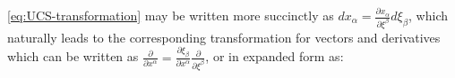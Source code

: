 \ref{eq:UCS-transformation} may be written more succinctly as 
$d{x_\alpha } = \frac{{\partial {x_\alpha }}}{{\partial {\xi ^\beta
}}}d{\xi _\beta }$, which naturally leads to the corresponding
transformation for vectors and derivatives which can be written as
$\frac{\partial }{{\partial {x^\alpha }}} = \frac{{\partial {\xi
      _\beta }}}{{\partial {x^\alpha }}}\frac{\partial }{{\partial
    {\xi ^\beta }}}$, or in expanded form as:
